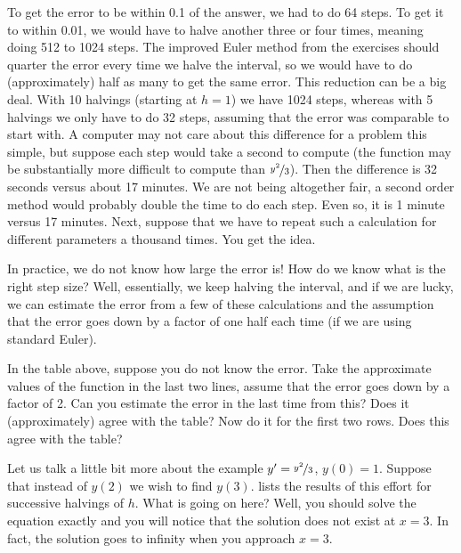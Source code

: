 To get the error to be within 0.1 of the answer, we had to
do 64 steps.  To get it to within 0.01, we would have to halve another three or
four times, meaning doing 512 to 1024 steps.
The improved Euler method from the exercises
should quarter the
error every time we halve the interval,
so we would have to do (approximately) half as many
 to get the same error.  This reduction can be a big deal.  With 10
halvings (starting at $h=1$) we have 1024 steps, whereas with 5 halvings
we only have to do 32 steps, assuming that the error was comparable to start
with.  A computer may not care about this
difference for a problem this simple, but suppose each step would take a
second to compute (the function may be substantially more difficult to compute
than $\nicefrac{y^2}{3}$).  Then the difference is 32 seconds versus about 17 minutes.
We are not being altogether fair, a second order method would probably
double the time to do each step.  Even so, it is 1 minute versus 17 minutes.
Next, suppose that we have to repeat such a calculation for different
parameters a thousand times.  You get the idea.

In practice, we do not know how large the error is!
How do we know what is
the right step size?  Well, essentially, we keep halving the interval, and if we
are lucky, we can estimate the error from a few of these calculations and the
assumption that the error goes down by a factor of one half each time (if
we are using standard Euler).

\begin{exercise}
In the table above, suppose you do not know the error.  Take
the approximate values of the function in the last two lines,
assume that the error goes down by a factor of 2.  Can you estimate the
error in the last time from this?  Does it (approximately) agree with the
table?  Now do it for the first two rows.  Does this agree with the table?
\end{exercise}

Let us talk a little bit more about the example
$y' = \nicefrac{y^2}{3}$, $y(0) =
1$.  Suppose that instead of $y(2)$ we wish to find $y(3)$.
lists the results of this effort
for successive halvings of $h$.  What is
going on here?  Well, you should solve the equation exactly and you will
notice that the solution does not exist at $x=3$.  In fact, the solution goes
to infinity when you approach $x=3$.

